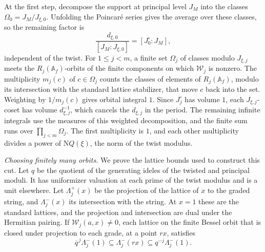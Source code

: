At the first step, decompose the support at principal level \(J_M\)
into the classes \(\Omega_0=J_M/J_{\xi,0}\).
Unfolding the Poincar\'e series gives the average over these classes,
so the remaining factor is
\[
 \frac{d_{\xi,0}}{[J_M:J_{\xi,0}]}=[J^\circ_0:J_M],
\]
independent of the twist.
For \(1\le j<m\), a finite set \(\Omega_j\) of classes modulo
\(J_{\xi,j}\) meets the \(R_j(\mathbb A_f)\)-orbits of the finite
components on which \(\mathcal W_j\) is nonzero.
The multiplicity \(m_j(c)\) of \(c\in\Omega_j\) counts the classes
of elements of \(R_j(\mathbb A_f)\), modulo its intersection with
the standard lattice stabilizer, that move \(c\) back into the set.
Weighting by \(1/m_j(c)\) gives orbital integral \(1\).
Since \(J^\circ_j\) has volume \(1\), each \(J_{\xi,j}\)-coset has
volume \(d_{\xi,j}^{-1}\), which cancels the \(d_{\xi,j}\) in the
period. The remaining infinite integrals use the measures of this
weighted decomposition, and the finite sum runs over
\(\prod_{j<m}\Omega_j\).
The first multiplicity is \(1\), and each other multiplicity
divides a power of \(\mathrm NQ(\xi)\), the norm of the twist modulus.

\emph{Choosing finitely many orbits.}
We prove the lattice bounds used to construct this cut.
Let \(q\) be the quotient of the generating ideles of the twisted
and principal moduli. It has uniformizer valuation at each prime
of the twist modulus and is a unit elsewhere. Let
\(\Lambda_j^+(x)\) be the projection of the lattice of \(x\) to the
graded string, and \(\Lambda_j^-(x)\) its intersection with the
string. At \(x=1\) these are the standard lattices, and the
projection and intersection are dual under the Hermitian pairing.
If \(\mathcal W_j(a,x)\ne0\), each lattice on the finite Bessel
orbit that is closed under projection to each grade, at a point
\(rx\), satisfies
\begin{equation}\label{eq:upper-cut-lattices}
  \overline q^{\,j}\Lambda_j^-(1)\subseteq\Lambda_j^-(r x)
             \subseteq q^{-j}\Lambda_j^-(1).
\end{equation}

